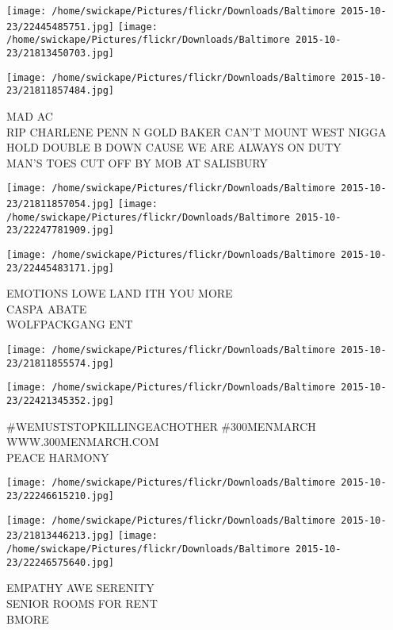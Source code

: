 \documentclass[10pt,letterpaper]{article}
\begin{document}
\texttt{[image: /home/swickape/Pictures/flickr/Downloads/Baltimore 2015-10-23/22445485751.jpg]}
\texttt{[image: /home/swickape/Pictures/flickr/Downloads/Baltimore 2015-10-23/21813450703.jpg]}

\vspace{0.25in}
\texttt{[image: /home/swickape/Pictures/flickr/Downloads/Baltimore 2015-10-23/21811857484.jpg]}

MAD AC\\
RIP CHARLENE PENN N GOLD BAKER CAN'T MOUNT WEST NIGGA HOLD DOUBLE B DOWN CAUSE WE ARE ALWAYS ON DUTY\\
MAN'S TOES CUT OFF BY MOB AT SALISBURY\\
\pagebreak

\texttt{[image: /home/swickape/Pictures/flickr/Downloads/Baltimore 2015-10-23/21811857054.jpg]}
\texttt{[image: /home/swickape/Pictures/flickr/Downloads/Baltimore 2015-10-23/22247781909.jpg]}

\texttt{[image: /home/swickape/Pictures/flickr/Downloads/Baltimore 2015-10-23/22445483171.jpg]}

EMOTIONS LOWE LAND ITH YOU MORE\\
CASPA ABATE\\
WOLFPACKGANG ENT\\
\pagebreak

\texttt{[image: /home/swickape/Pictures/flickr/Downloads/Baltimore 2015-10-23/21811855574.jpg]}

\vspace{0.25in}
\texttt{[image: /home/swickape/Pictures/flickr/Downloads/Baltimore 2015-10-23/22421345352.jpg]}

\#WEMUSTSTOPKILLINGEACHOTHER \#300MENMARCH WWW.300MENMARCH.COM\\
PEACE HARMONY\\
\pagebreak

\texttt{[image: /home/swickape/Pictures/flickr/Downloads/Baltimore 2015-10-23/22246615210.jpg]}

\vspace{0.25in}
\texttt{[image: /home/swickape/Pictures/flickr/Downloads/Baltimore 2015-10-23/21813446213.jpg]}
\texttt{[image: /home/swickape/Pictures/flickr/Downloads/Baltimore 2015-10-23/22246575640.jpg]}

EMPATHY AWE SERENITY\\
SENIOR ROOMS FOR RENT\\
BMORE\\
\pagebreak
\end{document}

